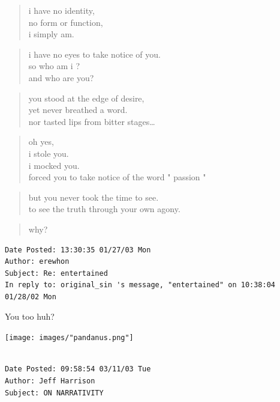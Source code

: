 \documentclass[
]{memoir}
\begin{document}
\begin{verse}
i have no identity,\\
no form or function,\\
i simply am.\\
\end{verse}

\begin{verse}
i have no eyes to take notice of you.\\
so who am i ?\\
and who are you?\\
\end{verse}

\begin{verse}
you stood at the edge of desire,\\
yet never breathed a word.\\
nor tasted lips from bitter stages…\\
\end{verse}

\begin{verse}
oh yes,\\
i stole you.\\
i mocked you.\\
forced you to take notice of the word " passion "\\
\end{verse}

\begin{verse}
but you never took the time to see.\\
to see the truth through your own agony.\\
\end{verse}

\begin{verse}
why?\\
\end{verse}

\begin{verbatim}
Date Posted: 13:30:35 01/27/03 Mon
Author: erewhon
Subject: Re: entertained
In reply to: original_sin 's message, "entertained" on 10:38:04 01/28/02 Mon
\end{verbatim}

You too huh?

\begin{center}\texttt{[image: images/"pandanus.png"]}\end{center}

\begin{verbatim}

Date Posted: 09:58:54 03/11/03 Tue
Author: Jeff Harrison
Subject: ON NARRATIVITY
\end{verbatim}
\end{document}
